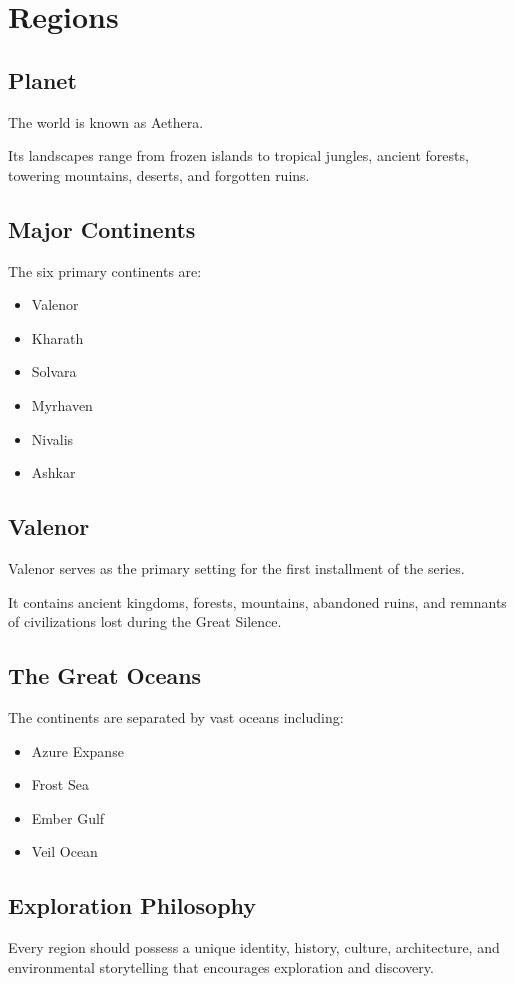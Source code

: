 \chapter{Regions}

\section{Planet}

The world is known as Aethera.

Its landscapes range from frozen islands to tropical jungles, ancient forests, towering mountains, deserts, and forgotten ruins.

\section{Major Continents}

The six primary continents are:

\begin{itemize}
    \item Valenor
    \item Kharath
    \item Solvara
    \item Myrhaven
    \item Nivalis
    \item Ashkar
\end{itemize}

\section{Valenor}

Valenor serves as the primary setting for the first installment of the series.

It contains ancient kingdoms, forests, mountains, abandoned ruins, and remnants of civilizations lost during the Great Silence.

\section{The Great Oceans}

The continents are separated by vast oceans including:

\begin{itemize}
    \item Azure Expanse
    \item Frost Sea
    \item Ember Gulf
    \item Veil Ocean
\end{itemize}

\section{Exploration Philosophy}

Every region should possess a unique identity, history, culture, architecture, and environmental storytelling that encourages exploration and discovery.